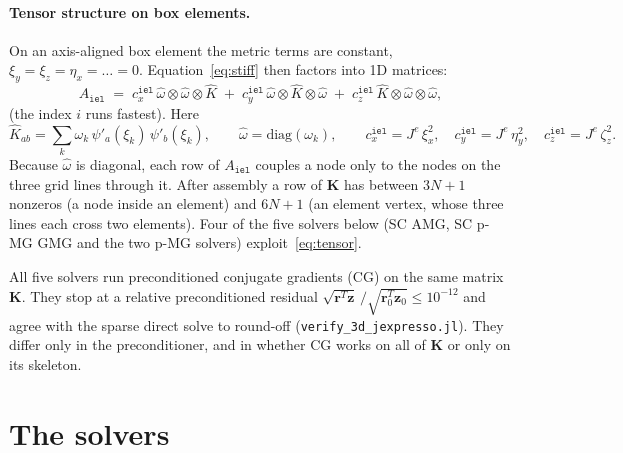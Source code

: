 \documentclass[11pt]{article}
\newcommand{\iel}{\mathtt{iel}}
\newcommand{\Je}{J^{e}}
\newcommand{\K}{\mathbf{K}}
\newcommand{\rr}{\mathbf{r}}
\newcommand{\zz}{\mathbf{z}}
\newcommand{\Khat}{\widehat{K}}
\newcommand{\What}{\widehat{\omega}}
\newcommand{\code}[1]{\texttt{#1}}
\begin{document}
\paragraph{Tensor structure on box elements.} On an axis-aligned box element the metric terms are
constant, $\xi_y=\xi_z=\eta_x=\dots=0$. Equation~\eqref{eq:stiff} then factors into 1D matrices:
\begin{equation}
  A_{\iel} \;=\; c^{\iel}_x\, \What\otimes\What\otimes\Khat \;+\; c^{\iel}_y\, \What\otimes\Khat\otimes\What
  \;+\; c^{\iel}_z\, \Khat\otimes\What\otimes\What ,
  \label{eq:tensor}
\end{equation}
(the index $i$ runs fastest). Here
\begin{equation}
  \Khat_{ab} = \sum_k \omega_k\,\psi'_a(\xi_k)\,\psi'_b(\xi_k), \qquad \What=\mathrm{diag}(\omega_k),
  \qquad c^{\iel}_x = \Je\,\xi_x^2,\quad c^{\iel}_y = \Je\,\eta_y^2,\quad c^{\iel}_z = \Je\,\zeta_z^2 .
  \label{eq:1d}
\end{equation}
Because $\What$ is diagonal, each row of $A_{\iel}$ couples a node only to the nodes on the three grid
lines through it. After assembly a row of $\K$ has between $3N+1$ nonzeros (a node inside an element)
and $6N+1$ (an element vertex, whose three lines each cross two elements). Four of the five solvers
below (SC AMG, SC p-MG GMG and the two p-MG solvers) exploit~\eqref{eq:tensor}.

All five solvers run preconditioned conjugate gradients (CG) on the same matrix $\K$. They stop at
a relative preconditioned residual $\sqrt{\rr^T\zz}\,/\sqrt{\rr_0^T\zz_0}\le 10^{-12}$ and agree with the
sparse direct solve to round-off (\code{verify\_3d\_jexpresso.jl}). They differ only in the
preconditioner, and in whether CG works on all of $\K$ or only on its skeleton.

\section{The solvers}
\end{document}
